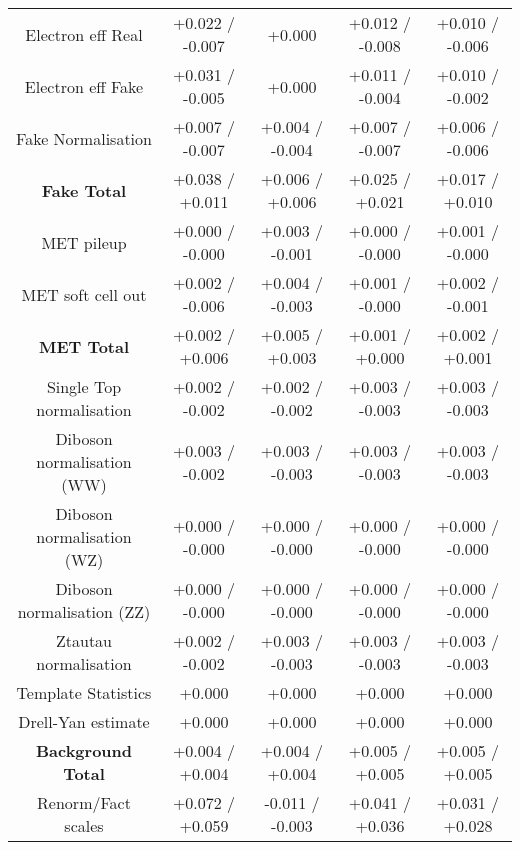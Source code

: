 \begin{table}[htbp]
\begin{center}
\begin{tabular}{|c|c|c|c|c|}
Electron eff Real                     &+0.022   / -0.007   & +0.000              & +0.012   / -0.008   & +0.010   / -0.006  \\
Electron eff Fake                     &+0.031   / -0.005   & +0.000              & +0.011   / -0.004   & +0.010   / -0.002  \\
Fake Normalisation                    &+0.007   / -0.007   & +0.004   / -0.004   & +0.007   / -0.007   & +0.006   / -0.006  \\
\hline
\textbf{Fake Total}                   &+0.038   / +0.011   & +0.006   / +0.006   & +0.025   / +0.021   & +0.017   / +0.010  \\
\hline
MET pileup                            &+0.000   / -0.000   & +0.003   / -0.001   & +0.000   / -0.000   & +0.001   / -0.000  \\
MET soft cell out                     &+0.002   / -0.006   & +0.004   / -0.003   & +0.001   / -0.000   & +0.002   / -0.001  \\
\hline
\textbf{MET Total}                    &+0.002   / +0.006   & +0.005   / +0.003   & +0.001   / +0.000   & +0.002   / +0.001  \\
\hline
Single Top normalisation              &+0.002   / -0.002   & +0.002   / -0.002   & +0.003   / -0.003   & +0.003   / -0.003  \\
Diboson normalisation (WW)            &+0.003   / -0.002   & +0.003   / -0.003   & +0.003   / -0.003   & +0.003   / -0.003  \\
Diboson normalisation (WZ)            &+0.000   / -0.000   & +0.000   / -0.000   & +0.000   / -0.000   & +0.000   / -0.000  \\
Diboson normalisation (ZZ)            &+0.000   / -0.000   & +0.000   / -0.000   & +0.000   / -0.000   & +0.000   / -0.000  \\
Ztautau normalisation                 &+0.002   / -0.002   & +0.003   / -0.003   & +0.003   / -0.003   & +0.003   / -0.003  \\
Template Statistics                   &+0.000              & +0.000              & +0.000              & +0.000             \\
Drell-Yan estimate                    &+0.000              & +0.000              & +0.000              & +0.000             \\
\hline
\textbf{Background Total}             &+0.004   / +0.004   & +0.004   / +0.004   & +0.005   / +0.005   & +0.005   / +0.005  \\
\hline
Renorm/Fact scales                    &+0.072   / +0.059   & -0.011   / -0.003   & +0.041   / +0.036   & +0.031   / +0.028  \\

\end{tabular}
\end{center}
\end{table}
